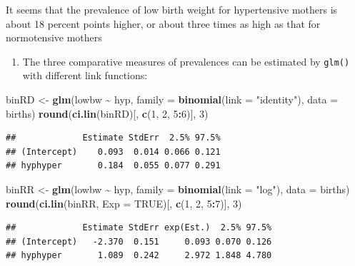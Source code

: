 \documentclass[
]{book}
\newenvironment{Shaded}{\begin{snugshade}}{\end{snugshade}}
\newcommand{\AttributeTok}[1]{\textcolor[rgb]{0.13,0.29,0.53}{#1}}
\newcommand{\ConstantTok}[1]{\textcolor[rgb]{0.56,0.35,0.01}{#1}}
\newcommand{\DecValTok}[1]{\textcolor[rgb]{0.00,0.00,0.81}{#1}}
\newcommand{\FunctionTok}[1]{\textcolor[rgb]{0.13,0.29,0.53}{\textbf{#1}}}
\newcommand{\NormalTok}[1]{#1}
\newcommand{\OtherTok}[1]{\textcolor[rgb]{0.56,0.35,0.01}{#1}}
\newcommand{\SpecialCharTok}[1]{\textcolor[rgb]{0.81,0.36,0.00}{\textbf{#1}}}
\newcommand{\StringTok}[1]{\textcolor[rgb]{0.31,0.60,0.02}{#1}}
\providecommand{\tightlist}{%
  \setlength{\itemsep}{0pt}\setlength{\parskip}{0pt}}
\theoremstyle{definition}
\theoremstyle{definition}
\theoremstyle{definition}
\theoremstyle{definition}
\theoremstyle{remark}
\begin{document}
It seems that the prevalence of low birth weight
for hypertensive mothers is about 18 percent points higher,
or about three times as high as that for normotensive mothers

\begin{enumerate}
\def\labelenumi{\arabic{enumi}.}
\setcounter{enumi}{1}
\tightlist
\item
  The three comparative measures of prevalences can be
  estimated by \texttt{glm()} with different link functions:
\end{enumerate}

\begin{Shaded}
\begin{Highlighting}[]
\NormalTok{binRD }\OtherTok{\textless{}{-}} \FunctionTok{glm}\NormalTok{(lowbw }\SpecialCharTok{\textasciitilde{}}\NormalTok{ hyp, }\AttributeTok{family =} \FunctionTok{binomial}\NormalTok{(}\AttributeTok{link =} \StringTok{"identity"}\NormalTok{), }\AttributeTok{data =}\NormalTok{ births)}
\FunctionTok{round}\NormalTok{(}\FunctionTok{ci.lin}\NormalTok{(binRD)[, }\FunctionTok{c}\NormalTok{(}\DecValTok{1}\NormalTok{, }\DecValTok{2}\NormalTok{, }\DecValTok{5}\SpecialCharTok{:}\DecValTok{6}\NormalTok{)], }\DecValTok{3}\NormalTok{)}
\end{Highlighting}
\end{Shaded}

\begin{verbatim}
##             Estimate StdErr  2.5% 97.5%
## (Intercept)    0.093  0.014 0.066 0.121
## hyphyper       0.184  0.055 0.077 0.291
\end{verbatim}

\begin{Shaded}
\begin{Highlighting}[]
\NormalTok{binRR }\OtherTok{\textless{}{-}} \FunctionTok{glm}\NormalTok{(lowbw }\SpecialCharTok{\textasciitilde{}}\NormalTok{ hyp, }\AttributeTok{family =} \FunctionTok{binomial}\NormalTok{(}\AttributeTok{link =} \StringTok{"log"}\NormalTok{), }\AttributeTok{data =}\NormalTok{ births)}
\FunctionTok{round}\NormalTok{(}\FunctionTok{ci.lin}\NormalTok{(binRR, }\AttributeTok{Exp =} \ConstantTok{TRUE}\NormalTok{)[, }\FunctionTok{c}\NormalTok{(}\DecValTok{1}\NormalTok{, }\DecValTok{2}\NormalTok{, }\DecValTok{5}\SpecialCharTok{:}\DecValTok{7}\NormalTok{)], }\DecValTok{3}\NormalTok{)}
\end{Highlighting}
\end{Shaded}

\begin{verbatim}
##             Estimate StdErr exp(Est.)  2.5% 97.5%
## (Intercept)   -2.370  0.151     0.093 0.070 0.126
## hyphyper       1.089  0.242     2.972 1.848 4.780
\end{verbatim}
\end{document}
